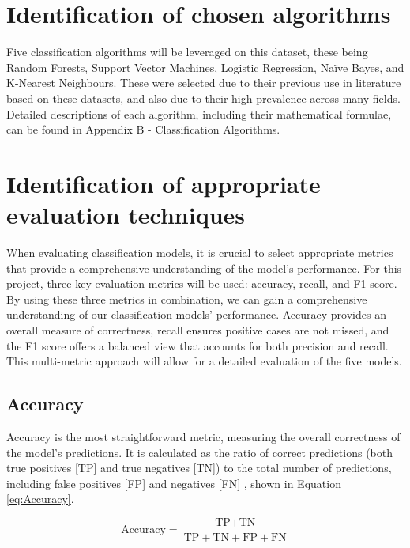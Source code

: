 \documentclass[12pt]{report}
\begin{document}
\section{Identification of chosen algorithms}\label{sec:ChosenAlgorithms}
Five classification algorithms will be leveraged on this dataset, these being Random Forests,
Support Vector Machines, Logistic Regression, Na\"ive Bayes, and K-Nearest Neighbours. These were 
selected due to their previous use in literature based on these datasets, and also due to their 
high prevalence across many fields. Detailed descriptions of each algorithm, including their 
mathematical formulae, can be found in Appendix B - Classification Algorithms.

\section{Identification of appropriate evaluation techniques}\label{sec:ChosenMetrics}
When evaluating classification models, it is crucial to select appropriate metrics that provide a comprehensive understanding of the model's performance.
For this project, three key evaluation metrics will be used: accuracy, recall, and F1 score. 
By using these three metrics in combination, we can gain a comprehensive understanding of our classification models' performance. Accuracy provides an overall measure of correctness,
recall ensures positive cases are not missed, and the F1 score offers a balanced view that accounts for both precision and recall.
This multi-metric approach will allow for a detailed evaluation of the five models.

\subsection{Accuracy}
Accuracy is the most straightforward metric, measuring the overall correctness of the model's predictions. It is calculated as the ratio of correct predictions
(both true positives [TP] and true negatives [TN]) to the total number of predictions, including false positives [FP] and negatives [FN] \autocite{google_classification_nodate},
shown in Equation \ref{eq:Accuracy}.

\begin{equation}\label{eq:Accuracy}
    \text{Accuracy} = \frac{\text{TP} + \text{TN}}{\text{TP} + \text{TN} + \text{FP} + \text{FN}}
\end{equation}
\end{document}
